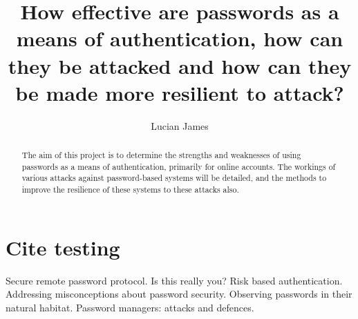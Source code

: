 \documentclass[11pt]{article}
\title{How effective are passwords as a means of authentication, how can they be attacked and how can they be made more resilient to attack?}
\author{Lucian James}
\begin{document}
\maketitle

\begin{abstract}
The aim of this project is to determine the strengths and weaknesses of using passwords as a means of authentication, primarily for online accounts.
The workings of various attacks against password-based systems will be detailed, and the methods to improve the resilience of these systems to these attacks also.
\end{abstract}

\section{Cite testing}
Secure remote password protocol\cite{wu1998secure}.
Is this really you? Risk based authentication\cite{wiefling2019really}.
Addressing misconceptions about password security\cite{mayer2018addressing}.
Observing passwords in their natural habitat\cite{pearman2017let}.
Password managers: attacks and defences\cite{silver2014password}.


\end{document}
